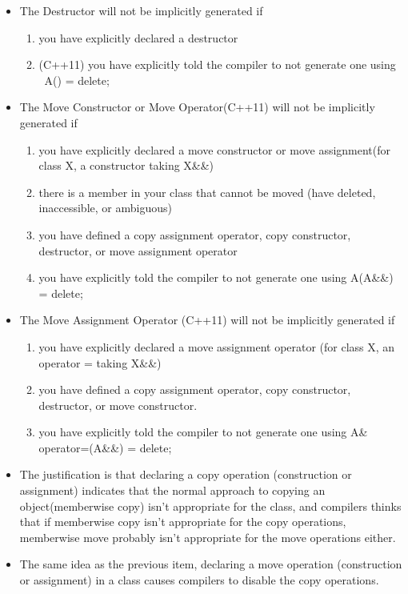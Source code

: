 \documentclass[a4paper,11pt,twoside]{book}
\begin{document}
\begin{itemize}
\item The Destructor will not be implicitly generated if
\begin{enumerate}
\item you have explicitly declared a destructor
\item (C++11) you have explicitly told the compiler to not generate one using ~A() = delete;
\end{enumerate}

\item The Move Constructor or Move Operator(C++11) will not be implicitly generated if
\begin{enumerate}
\item you have explicitly declared a move constructor or move assignment(for class X, a constructor taking X\&\&)
\item there is a member in your class that cannot be moved (have deleted, inaccessible, or ambiguous)
\item you have defined a copy assignment operator, copy constructor, destructor, or move assignment operator
\item you have explicitly told the compiler to not generate one using A(A\&\&) = delete;
\end{enumerate}


\item The Move Assignment Operator (C++11) will not be implicitly generated if
\begin{enumerate}
\item you have explicitly declared a move assignment operator (for class X, an operator = taking X\&\&)

\item you have defined a copy assignment operator, copy constructor, destructor, or move constructor.

\item you have explicitly told the compiler to not generate one using A\& operator=(A\&\&) = delete;
\end{enumerate}

\item  The justification is that declaring a copy operation (construction or assignment) indicates that the normal approach to copying an object(memberwise copy) isn't appropriate for the class, and compilers thinks that if memberwise copy isn't appropriate for the copy operations, memberwise move probably isn't appropriate for the move operations either.

\item The same idea as the previous item, declaring a move operation (construction or assignment) in a class causes compilers to disable the copy operations.


\end{itemize}
\end{document}
